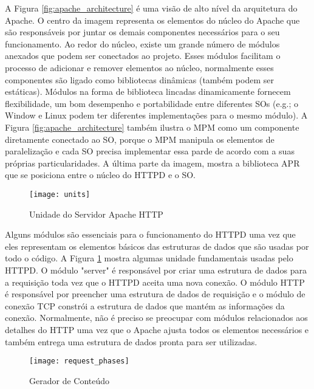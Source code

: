 A Figura \ref{fig:apache_architecture} é uma visão de alto nível da arquitetura
do Apache. O centro da imagem representa os elementos do núcleo do Apache que
são responsáveis por juntar os demais componentes necessários para o seu
funcionamento. Ao redor do núcleo, existe um grande número de módulos anexados
que podem ser conectados ao projeto. Esses módulos facilitam o processo de
adicionar e remover elementos ao núcleo, normalmente esses componentes são
ligado como bibliotecas dinâmicas (também podem ser estáticas). Módulos na
forma de biblioteca lincadas dinamicamente fornecem flexibilidade, um bom
desempenho e portabilidade entre diferentes SOs (e.g.; o Window e Linux podem
ter diferentes implementações para o mesmo módulo). A Figura
\ref{fig:apache_architecture} também ilustra o MPM como um componente
diretamente conectado ao SO, porque o MPM manipula os elementos de
paralelização e cada SO precisa implementar essa parde de acordo com a suas
próprias particularidades. A última parte da imagem, mostra a biblioteca APR
que se posiciona entre o núcleo do HTTPD e o SO.

\begin{figure}[!h]
  \centering
  \texttt{[image: units]} 
  \caption{Unidade do Servidor Apache HTTP}
  \label{fig:units} 
\end{figure}

Alguns módulos são essenciais para o funcionamento do HTTPD uma vez que eles
representam os elementos básicos das estruturas de dados que são usadas por
todo o código. A Figura \ref{fig:units} mostra algumas unidade fundamentais
usadas pelo HTTPD. O módulo "server" é responsável por criar uma estrutura de
dados para a requisição toda vez que o HTTPD aceita uma nova conexão. O módulo
HTTP é responsável por preencher uma estrutura de dados de requisição e o
módulo de conexão TCP constrói a estrutura de dados que mantém as informações
da conexão. Normalmente, não é preciso se preocupar com módulos relacionados
aos detalhes do HTTP uma vez que o Apache ajusta todos os elementos necessários
e também entrega uma estrutura de dados pronta para ser utilizadas.

\begin{figure}[!h]
  \centering
  \texttt{[image: request\_phases]} 
  \caption{Gerador de Conteúdo \citep{apache_module_book}}
  \label{fig:content_generator} 
\end{figure}

